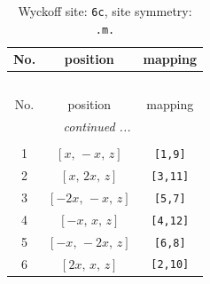 \documentclass[fleqn,8pt]{jsarticle}
\begin{document}
\renewcommand{\arraystretch}{1.2}
\begin{longtable}{ccc}
\caption{Wyckoff site: {\tt 6c}, site symmetry: {\tt .m.}}
 \\
 \hline \hline
No. & position & mapping \\ \hline \endfirsthead

\multicolumn{2}{l}{\tablename\ \thetable{}} \\
 \hline \hline
No. & position & mapping \\ \hline \endhead

 \hline \hline
\multicolumn{2}{r}{\footnotesize\it continued ...} \\ \endfoot

 \hline \hline
\multicolumn{2}{r}{} \\ \endlastfoot

1 & $\left[ x,\, - x,\, z \right]$ & {\tt [1,9]} \\ \hline
2 & $\left[ x,\, 2 x,\, z \right]$ & {\tt [3,11]} \\ \hline
3 & $\left[ - 2 x,\, - x,\, z \right]$ & {\tt [5,7]} \\ \hline
4 & $\left[ - x,\, x,\, z \right]$ & {\tt [4,12]} \\ \hline
5 & $\left[ - x,\, - 2 x,\, z \right]$ & {\tt [6,8]} \\ \hline
6 & $\left[ 2 x,\, x,\, z \right]$ & {\tt [2,10]} \\
\end{longtable}
\renewcommand{\arraystretch}{1.2}
\end{document}
